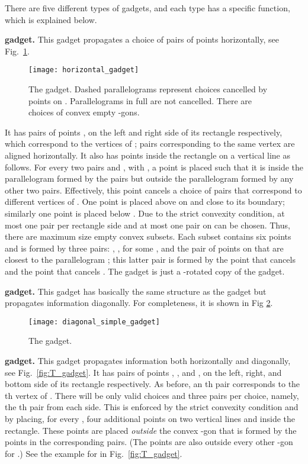 \documentclass[11pt,a4paper]{article}
\begin{document}
There are five different types of gadgets, and each type has a specific function, which is explained below.

\medskip
\noindent
{ \textbf {gadget.}} This gadget propagates a choice of pairs of points horizontally, see Fig.~\ref{fig:horizontal_gadget}. 
\begin{figure}[h]
\centering
	\texttt{[image: horizontal\_gadget]}
	\caption{The  gadget. Dashed parallelograms represent choices cancelled by points on . Parallelograms in full are not cancelled. There are  choices of convex empty -gons.}
	\label{fig:horizontal_gadget}
\end{figure}
It has  pairs of points ,  on the left and right side of its rectangle respectively, which correspond to the vertices of ; pairs corresponding to the same vertex are aligned horizontally. It also has  points inside the rectangle on a vertical line  as follows. For every two pairs  and , with , a point is placed such that it is inside the parallelogram  formed by the pairs but outside the parallelogram formed by any other two pairs. Effectively, this point cancels a choice of pairs that correspond to different vertices of . One point is placed above  on  and close to its boundary; similarly one point is placed below .  Due to the strict convexity condition, at most one pair per rectangle side and at most one pair on  can be chosen. Thus, there are  maximum size empty convex subsets. Each subset contains six points and is formed by three pairs: , , for some , and the pair of points on  that are closest to the parallelogram ; this latter pair is formed by the point that cancels  and the point that cancels . The  gadget is just a -rotated copy of the  gadget.

\medskip
\noindent
{ \textbf{gadget.}} This gadget has basically the same structure as the  gadget but propagates information diagonally. For completeness, it is shown in Fig \ref{fig:diagonal_simple_gadget}.
\begin{figure}[h]
\centering
	\texttt{[image: diagonal\_simple\_gadget]}
	\caption[]{The  gadget.}
	\label{fig:diagonal_simple_gadget}
\end{figure}

\medskip
\noindent
{ \textbf{gadget.}} This gadget propagates information both horizontally and diagonally, see Fig.~\ref{fig:T_gadget}. It has  pairs of points , , and , on the left, right, and bottom side of its rectangle respectively. As before, an th pair corresponds to the th vertex of . There will be only  valid choices and three pairs per choice, namely, the th pair from each side. This is enforced by the strict convexity condition and by placing, for every , four additional points on two vertical lines  and  inside the rectangle. These points are placed \emph{outside} the convex -gon  that is formed by the points in the corresponding pairs. (The points are also outside every other -gon for .) See the example for  in Fig.~\ref{fig:T_gadget}. 
\end{document}
